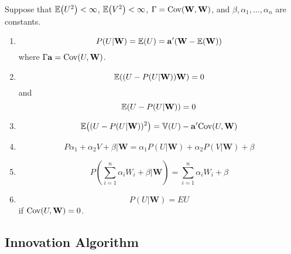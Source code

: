  \begin{defn}
  \label{defn:stationary_processes:1}
  Suppose that $\E{U^{2}} < \infty$, $\E{V^{2}} < \infty$, $\Gamma =
  \Cov{\mathbf{W}}{\mathbf{W}}$, and $\beta, \alpha_{1}, \dots,
  \alpha_{n}$ are constants.

  \begin{enumerate}
  \item
    \begin{equation}
      P(U | \mathbf{W}) = \E{U} = \mathbf{a}'(\mathbf{W} - \E{\mathbf{W}})
    \end{equation}
    where $\Gamma \mathbf{a} = \Cov{U}{\mathbf{W}}$.
  \item
    \begin{equation}
      \E{(U - P(U | \mathbf{W})) \mathbf{W}} = 0
    \end{equation} and
    \begin{equation}
      \E{U - P(U | \mathbf{W})} = 0
    \end{equation}
  \item
    \begin{equation}
      \E{(U - P(U | \mathbf{W}))^{2}} = \Var{U} - \mathbf{a}' \Cov{U}{\mathbf{W}}
    \end{equation}
  \item
    \begin{equation}
      P{\alpha_{1} + \alpha_{2} V + \beta | \mathbf{W}} = \alpha_{1}
      P(U| \mathbf{W}) + \alpha_{2} P(V | \mathbf{W}) + \beta
    \end{equation}
  \item
    \begin{equation}
      P(\sum_{i=1}^{n} \alpha_{i} W_{i} + \beta | \mathbf{W}) =
      \sum_{i=1}^{n} \alpha_{i} W_{i} + \beta
    \end{equation}
  \item
    \begin{equation}
      \label{eq:15}
      P(U | \mathbf{W}) = E{U}
    \end{equation} if $\Cov{U}{\mathbf{W}} = 0$.
  \end{enumerate}
\end{defn}

\subsection{Innovation Algorithm}
\label{sec:innovation-algorithm}

